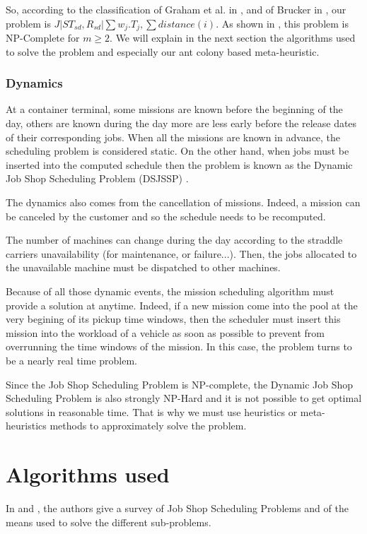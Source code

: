 \documentclass[a4paper,10pt]{article}
\begin{document}

So, according to the classification of Graham et al. in \cite{Graham1979}, and of Brucker in \cite{Brucker2010}, our problem is ${ J|ST_{sd}, R_{sd}|\sum w_j.T_{j} , \sum distance(i)}$. As shown in \cite{Garey1976}, this problem is NP-Complete for $m\geq2$.
We will explain in the next section the algorithms used to solve the problem and especially our ant colony based meta-heuristic.

\subsubsection{Dynamics}
At a container terminal, some missions are known before the beginning of the day, others are known during the day more are less early before the release dates of their corresponding jobs. When all the missions are known in advance, the scheduling problem is considered static. On the other hand, when jobs must be inserted into the computed schedule then the problem is known as the Dynamic Job Shop Scheduling Problem (DSJSSP) \cite{Ramasesh1990}. %

The dynamics also comes from the cancellation of missions. Indeed, a mission can be canceled by the customer and so the schedule needs to be recomputed.

The number of machines can change during the day according to the straddle carriers unavailability (for maintenance, or failure...). Then, the jobs allocated to the unavailable machine must be dispatched to other machines.

Because of all those dynamic events, the mission scheduling algorithm must provide a solution at anytime. Indeed, if a new mission come into the pool at the very begining of its pickup time windows, then the scheduler must insert this mission into the workload of a vehicle as soon as possible to prevent from overrunning the time windows of the mission. In this case, the problem turns to be a nearly real time problem.

Since the Job Shop Scheduling Problem is NP-complete, the Dynamic Job Shop Scheduling Problem is also strongly NP-Hard and it is not possible to get optimal solutions in reasonable time. That is why we must use heuristics or meta-heuristics methods to approximately solve the problem.

\section{Algorithms used}
  In \cite{Jain1999} and \cite{Brucker2010}, the authors give a survey of Job Shop Scheduling Problems and of the means used to solve the different sub-problems.
  
\end{document}
